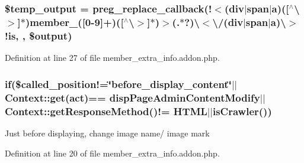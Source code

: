 \subsubsection[{\texorpdfstring{\$temp\+\_\+output}{$temp_output}}]{\setlength{\rightskip}{0pt plus 5cm}\$temp\+\_\+output = preg\+\_\+replace\+\_\+callback(\textquotesingle{}!$<$(div$\vert$span$\vert${\bf a})(\mbox{[}$^\wedge$\textbackslash{}$>$\mbox{]}$\ast$)member\+\_\+(\mbox{[}0-\/9\mbox{]}+)(\mbox{[}$^\wedge$\textbackslash{}$>$\mbox{]}$\ast$)$>$(.$\ast$?)\textbackslash{}$<$\textbackslash{}/(div$\vert$span$\vert${\bf a})\textbackslash{}$>$!is\textquotesingle{}, \textquotesingle{}, \$output)}\hypertarget{member__extra__info_8addon_8php_a5866ef6f77cbeaf87d8208cf805bbc3d}{}\label{member__extra__info_8addon_8php_a5866ef6f77cbeaf87d8208cf805bbc3d}


Definition at line 27 of file member\+\_\+extra\+\_\+info.\+addon.\+php.

\subsubsection[{\texorpdfstring{if}{if}}]{\setlength{\rightskip}{0pt plus 5cm}if(\$called\+\_\+position!=\char`\"{}before\+\_\+display\+\_\+content\char`\"{}$\vert$$\vert$Context\+::get(\textquotesingle{}act\textquotesingle{})== \textquotesingle{}disp\+Page\+Admin\+Content\+Modify\textquotesingle{}$\vert$$\vert${\bf Context\+::get\+Response\+Method}()!= \textquotesingle{}H\+T\+ML\textquotesingle{}$\vert$$\vert${\bf is\+Crawler}())}\hypertarget{member__extra__info_8addon_8php_a29031816e50a8f742422e671b2bef9b2}{}\label{member__extra__info_8addon_8php_a29031816e50a8f742422e671b2bef9b2}
Just before displaying, change image name/ image mark 

Definition at line 20 of file member\+\_\+extra\+\_\+info.\+addon.\+php.

